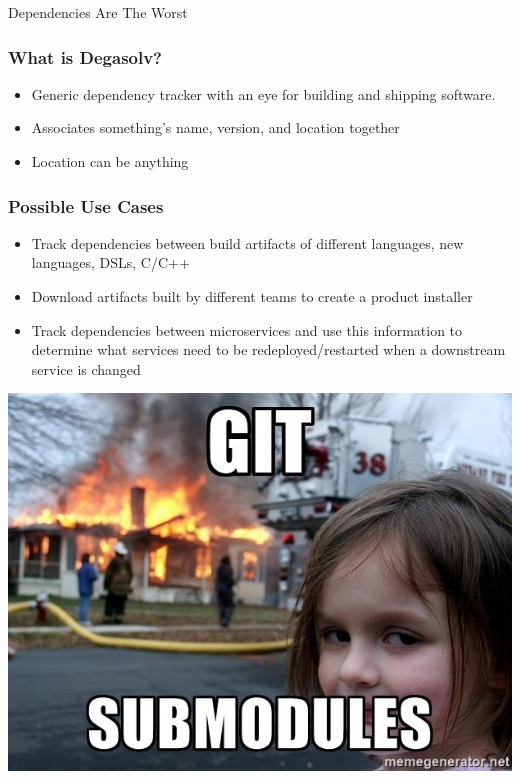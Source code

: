\documentclass{beamer}
\begin{document}
\begin{frame}[fragile]
  \centerline{\color{blue}\Large Dependencies Are The Worst}
\end{frame}
\begin{frame}
    \frametitle{What is Degasolv?}
  \begin{itemize}
      \item Generic dependency tracker with an eye for building and shipping
          software.
      \item Associates something's name, version, and location together
      \item Location can be anything
  \end{itemize}
\end{frame}

\begin{frame}
    \frametitle{Possible Use Cases}
    \begin{itemize}
        \item Track dependencies between build artifacts of different
            languages, new languages, DSLs, C/C++
        \item Download artifacts built by different teams to create a
            product installer
        \item Track dependencies between microservices and use this information
            to determine what services need to be redeployed/restarted
            when a downstream service is changed
    \end{itemize}
\end{frame}
\begin{frame}
  \centerline{\includegraphics[scale=0.5]{gitsubmodules.jpg}}
\end{frame}
\end{document}
